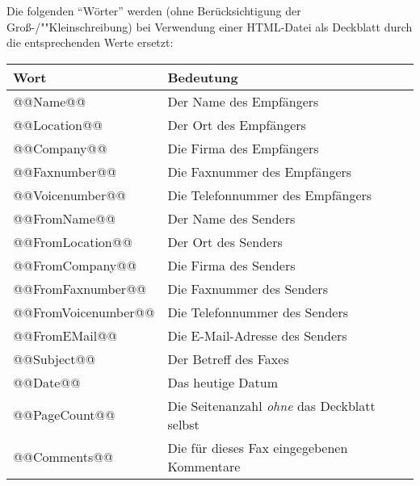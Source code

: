 \documentclass[a4paper,10pt,halfparskip,noparindent]{scrartcl}
\begin{document}
Die folgenden "`Wörter"' werden (ohne Berücksichtigung der Groß-/""Kleinschreibung) bei Verwendung einer HTML-Datei als Deckblatt durch die entsprechenden Werte ersetzt:

\begin{center}
\begin{tabular}{|l|l|}
\hline
\bfseries Wort & \bfseries Bedeutung \\
\hline\hline
\ttfamily @@Name@@ & Der Name des Empfängers \\\hline
\ttfamily @@Location@@ &  Der Ort des Empfängers \\\hline
\ttfamily @@Company@@ &  Die Firma des Empfängers \\\hline
\ttfamily @@Faxnumber@@ &  Die Faxnummer des Empfängers \\\hline
\ttfamily @@Voicenumber@@ &  Die Telefonnummer des Empfängers \\\hline
\ttfamily @@FromName@@ & Der Name des Senders \\\hline
\ttfamily @@FromLocation@@ &  Der Ort des Senders \\\hline
\ttfamily @@FromCompany@@ &  Die Firma des Senders \\\hline
\ttfamily @@FromFaxnumber@@ &  Die Faxnummer des Senders \\\hline
\ttfamily @@FromVoicenumber@@ &  Die Telefonnummer des Senders \\\hline
\ttfamily @@FromEMail@@ &  Die E-Mail-Adresse des Senders \\\hline
\ttfamily @@Subject@@ & Der Betreff des Faxes \\\hline
\ttfamily @@Date@@ & Das heutige Datum \\\hline
\ttfamily @@PageCount@@ & Die Seitenanzahl \textit{ohne} das Deckblatt selbst \\\hline
\ttfamily @@Comments@@ & Die für dieses Fax eingegebenen Kommentare \\\hline
\end{tabular}
\end{center}
\end{document}
